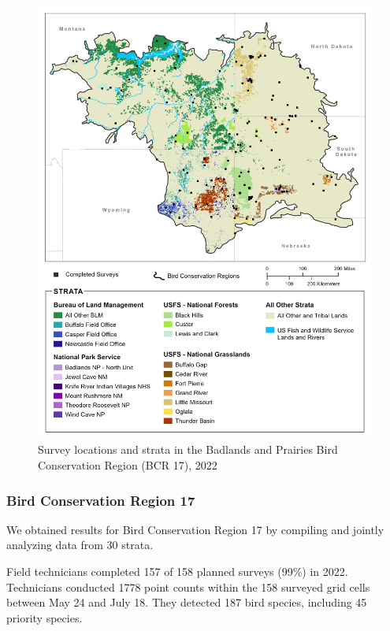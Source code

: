 \documentclass[
  letterpaper,
  DIV=11,
  numbers=noendperiod,
  oneside]{scrreprt}
\begin{document}
\begin{figure}

{\centering \includegraphics{./BCR17_Report_2022_NoLogo.png}

}

\caption{\label{fig-bcr-17}Survey locations and strata in the Badlands
and Prairies Bird Conservation Region (BCR 17), 2022}

\end{figure}

\hypertarget{bird-conservation-region-17}{%
\subsubsection{Bird Conservation Region
17}\label{bird-conservation-region-17}}

We obtained results for Bird Conservation Region 17 by compiling and
jointly analyzing data from 30 strata.

Field technicians completed 157 of 158 planned surveys (99\%) in 2022.
Technicians conducted 1778 point counts within the 158 surveyed grid
cells between May 24 and July 18. They detected 187 bird species,
including 45 priority species.
\end{document}
